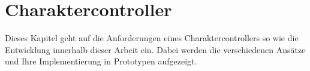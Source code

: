 {\chapter{Charaktercontroller}}
\label{sec:charaktercontroller}
Dieses Kapitel geht auf die Anforderungen eines Charaktercontrollers so wie die Entwicklung innerhalb dieser Arbeit ein. Dabei werden die verschiedenen Ansätze und Ihre Implementierung in Prototypen aufgezeigt.



